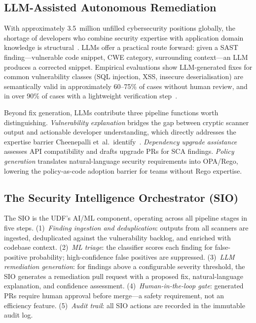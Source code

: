 \documentclass[letterpaper, 10pt, conference]{ieeeconf}
\begin{document}
\subsection{LLM-Assisted Autonomous Remediation}

With approximately 3.5~million unfilled cybersecurity positions
globally, the shortage of developers who combine security expertise
with application domain knowledge is structural~\cite{thota2024}. LLMs
offer a practical route forward: given a SAST finding---vulnerable code
snippet, CWE category, surrounding context---an LLM produces a corrected
snippet. Empirical evaluations show LLM-generated fixes for common
vulnerability classes (SQL injection, XSS, insecure deserialisation)
are semantically valid in approximately 60--75\% of cases without human
review, and in over 90\% of cases with a lightweight verification
step~\cite{thota2024}.

Beyond fix generation, LLMs contribute three pipeline functions worth
distinguishing. \textit{Vulnerability explanation} bridges the gap
between cryptic scanner output and actionable developer understanding,
which directly addresses the expertise barrier Cheenepalli et~al.\
identify~\cite{cheenepalli2025}. \textit{Dependency upgrade assistance}
assesses API compatibility and drafts upgrade PRs for SCA findings.
\textit{Policy generation} translates natural-language security
requirements into OPA/Rego, lowering the policy-as-code adoption
barrier for teams without Rego expertise.

\subsection{The Security Intelligence Orchestrator (SIO)}

The SIO is the UDF's AI/ML component, operating across all pipeline
stages in five steps. (1)~\textit{Finding ingestion and deduplication}:
outputs from all scanners are ingested, deduplicated against the
vulnerability backlog, and enriched with codebase context.
(2)~\textit{ML triage}: the classifier scores each finding for
false-positive probability; high-confidence false positives are
suppressed. (3)~\textit{LLM remediation generation}: for findings above
a configurable severity threshold, the SIO generates a remediation pull
request with a proposed fix, natural-language explanation, and confidence
assessment. (4)~\textit{Human-in-the-loop gate}: generated PRs require
human approval before merge---a safety requirement, not an efficiency
feature. (5)~\textit{Audit trail}: all SIO actions are recorded in the
immutable audit log.
\end{document}
